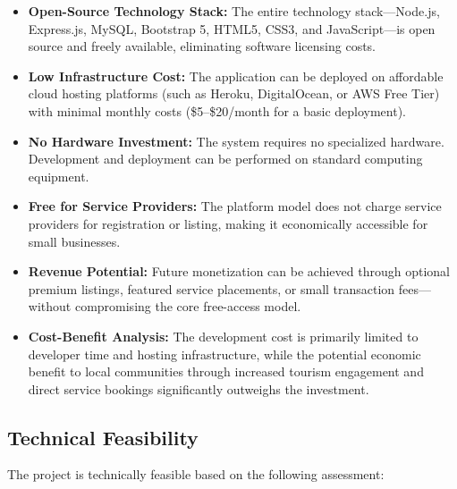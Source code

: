 \begin{itemize}[leftmargin=2em]
    \item \textbf{Open-Source Technology Stack:} The entire technology stack---Node.js, Express.js, MySQL, Bootstrap 5, HTML5, CSS3, and JavaScript---is open source and freely available, eliminating software licensing costs.
    \item \textbf{Low Infrastructure Cost:} The application can be deployed on affordable cloud hosting platforms (such as Heroku, DigitalOcean, or AWS Free Tier) with minimal monthly costs (\$5--\$20/month for a basic deployment).
    \item \textbf{No Hardware Investment:} The system requires no specialized hardware. Development and deployment can be performed on standard computing equipment.
    \item \textbf{Free for Service Providers:} The platform model does not charge service providers for registration or listing, making it economically accessible for small businesses.
    \item \textbf{Revenue Potential:} Future monetization can be achieved through optional premium listings, featured service placements, or small transaction fees---without compromising the core free-access model.
    \item \textbf{Cost-Benefit Analysis:} The development cost is primarily limited to developer time and hosting infrastructure, while the potential economic benefit to local communities through increased tourism engagement and direct service bookings significantly outweighs the investment.
\end{itemize}

\subsection{Technical Feasibility}

The project is technically feasible based on the following assessment:

